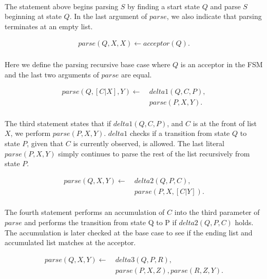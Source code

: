 \documentclass{article}
\theoremstyle{plain}
\theoremstyle{definition}
\begin{document}
\begin{multicols}{2}
\paragraph{} The statement above begins parsing $S$ by finding a start state $Q$ and parse $S$ beginning at state $Q$. In the last argument of $parse$, we also indicate that parsing terminates at an empty list.

\begin{align*}
parse(Q, X, X) \leftarrow acceptor(Q).
\end{align*}

\paragraph{} Here we define the parsing recursive base case where $Q$ is an acceptor in the FSM and the last two arguments of $parse$ are equal.

\begin{align*}
parse(Q, [C|X], Y) \leftarrow\ &delta1(Q, C, P),\\ &parse(P, X, Y).
\end{align*}

\paragraph{} The third statement states that if $delta1(Q, C, P)$, and $C$ is at the front of list $X$, we perform $parse(P, X, Y)$. $delta1$ checks if a transition from state $Q$ to state $P$, given that $C$ is currently observed, is allowed. The last literal $parse(P, X, Y)$ simply continues to parse the rest of the list recursively from state $P$.

\begin{align*}
parse(Q, X, Y) \leftarrow\ &delta2(Q, P, C),\\ &parse(P, X, [C|Y]).
\end{align*}

\paragraph{} The fourth statement performs an accumulation of $C$ into the third parameter of $parse$ and performs the transition from state Q to P if $delta2(Q, P, C)$ holds. The accumulation is later checked at the base case to see if the ending list and accumulated list matches at the acceptor.

\begin{align*}
parse(Q, X, Y) \leftarrow\ &delta3(Q, P, R),\\ &parse(P, X, Z), parse(R, Z, Y).
\end{align*}


\end{multicols}
\end{document}
